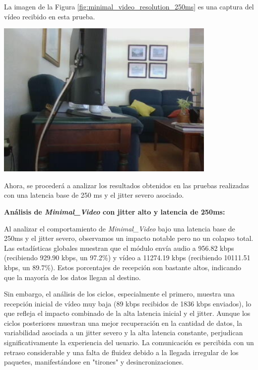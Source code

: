 \newpage
La imagen de la Figura \ref{fig:minimal_video_resolution_250ms} es una captura del vídeo recibido en esta prueba.
\begin{center}
  \includegraphics[width = 0.8\textwidth]{images/VideoRecibido6.3.png}
  \label{fig:minimal_video_resolution_250ms}
\end{center}
\newpage


Ahora, se procederá a analizar los resultados obtenidos en las pruebas realizadas con una latencia base de 250 ms y el jitter severo asociado.
\vspace{\baselineskip}

\textbf{Análisis de \textit{Minimal\_Video} con jitter alto y latencia de 250ms:}
\vspace{\baselineskip}

Al analizar el comportamiento de \textit{Minimal\_Video} bajo una latencia base de 250ms y el jitter severo, observamos un impacto notable pero no un colapso total. Las estadísticas globales muestran que el módulo envía audio a 956.82 kbps (recibiendo 929.90 kbps, un 97.2\%) y vídeo a 11274.19 kbps (recibiendo 10111.51 kbps, un 89.7\%). Estos porcentajes de recepción son bastante altos, indicando que la mayoría de los datos llegan al destino.
\vspace{\baselineskip}

Sin embargo, el análisis de los ciclos, especialmente el primero, muestra una recepción inicial de vídeo muy baja (89 kbps recibidos de 1836 kbps enviados), lo que refleja el impacto combinado de la alta latencia inicial y el jitter. Aunque los ciclos posteriores muestran una mejor recuperación en la cantidad de datos, la variabilidad asociada a un jitter severo y la alta latencia constante, perjudican significativamente la experiencia del usuario. La comunicación es percibida con un retraso considerable y una falta de fluidez debido a la llegada irregular de los paquetes, manifestándose en "tirones" y desincronizaciones.

